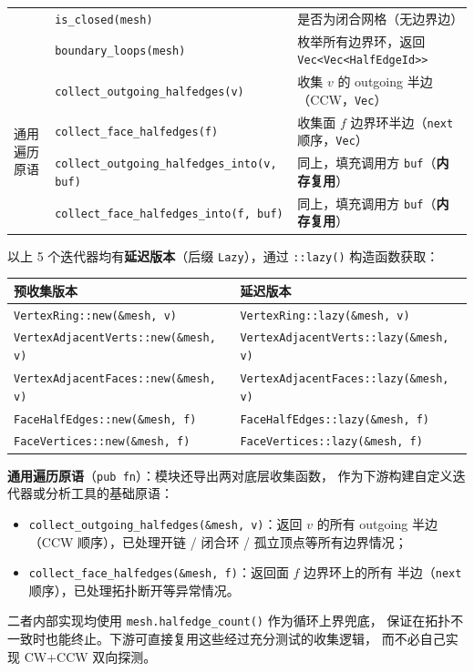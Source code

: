 \documentclass[11pt,a4paper]{article}
\begin{document}
\begin{center}
\begin{tabular}{@{}lll@{}}
    & \texttt{is\_closed(mesh)}         & 是否为闭合网格（无边界边） \\
    & \texttt{boundary\_loops(mesh)}    & 枚举所有边界环，返回 \texttt{Vec<Vec<HalfEdgeId>>} \\
  \midrule
  \multirow{4}{*}{通用遍历原语}
    & \texttt{collect\_outgoing\_halfedges(v)} & 收集 $v$ 的 outgoing 半边（CCW，\texttt{Vec}） \\
    & \texttt{collect\_face\_halfedges(f)}     & 收集面 $f$ 边界环半边（\texttt{next} 顺序，\texttt{Vec}） \\
    & \texttt{collect\_outgoing\_halfedges\_into(v, buf)} & 同上，填充调用方 \texttt{buf}（\textbf{内存复用}） \\
    & \texttt{collect\_face\_halfedges\_into(f, buf)}     & 同上，填充调用方 \texttt{buf}（\textbf{内存复用}） \\
  \bottomrule
\end{tabular}
\end{center}

以上 5 个迭代器均有\textbf{延迟版本}（后缀 \texttt{Lazy}），通过 \texttt{::lazy()} 构造函数获取：
\begin{center}
\renewcommand{\arraystretch}{1.18}
\begin{tabular}{@{}ll@{}}
  \toprule
  \textbf{预收集版本} & \textbf{延迟版本} \\
  \midrule
  \texttt{VertexRing::new(\&mesh, v)}          & \texttt{VertexRing::lazy(\&mesh, v)} \\
  \texttt{VertexAdjacentVerts::new(\&mesh, v)} & \texttt{VertexAdjacentVerts::lazy(\&mesh, v)} \\
  \texttt{VertexAdjacentFaces::new(\&mesh, v)} & \texttt{VertexAdjacentFaces::lazy(\&mesh, v)} \\
  \texttt{FaceHalfEdges::new(\&mesh, f)}       & \texttt{FaceHalfEdges::lazy(\&mesh, f)} \\
  \texttt{FaceVertices::new(\&mesh, f)}        & \texttt{FaceVertices::lazy(\&mesh, f)} \\
  \bottomrule
\end{tabular}
\end{center}

\textbf{通用遍历原语}（\texttt{pub fn}）：模块还导出两对底层收集函数，
作为下游构建自定义迭代器或分析工具的基础原语：
\begin{itemize}
  \item \texttt{collect\_outgoing\_halfedges(\&mesh, v)}：返回 $v$ 的所有 outgoing
        半边（CCW 顺序），已处理开链 / 闭合环 / 孤立顶点等所有边界情况；
  \item \texttt{collect\_face\_halfedges(\&mesh, f)}：返回面 $f$ 边界环上的所有
        半边（\texttt{next} 顺序），已处理拓扑断开等异常情况。
\end{itemize}
二者内部实现均使用 \texttt{mesh.halfedge\_count()} 作为循环上界兜底，
保证在拓扑不一致时也能终止。下游可直接复用这些经过充分测试的收集逻辑，
而不必自己实现 CW+CCW 双向探测。
\end{document}
